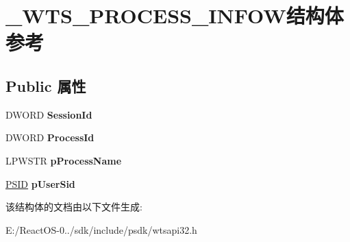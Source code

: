 \hypertarget{struct___w_t_s___p_r_o_c_e_s_s___i_n_f_o_w}{}\section{\+\_\+\+W\+T\+S\+\_\+\+P\+R\+O\+C\+E\+S\+S\+\_\+\+I\+N\+F\+O\+W结构体 参考}
\label{struct___w_t_s___p_r_o_c_e_s_s___i_n_f_o_w}
\subsection*{Public 属性}
\begin{DoxyCompactItemize}
\item 
\mbox{\label{struct___w_t_s___p_r_o_c_e_s_s___i_n_f_o_w_acb11e052069b87e968c0eb3c566c897b}} 
D\+W\+O\+RD {\bfseries Session\+Id}
\item 
\mbox{\label{struct___w_t_s___p_r_o_c_e_s_s___i_n_f_o_w_a42538ecc338fdffdccf7951b6bd9cc75}} 
D\+W\+O\+RD {\bfseries Process\+Id}
\item 
\mbox{\label{struct___w_t_s___p_r_o_c_e_s_s___i_n_f_o_w_acc8807395a67764dd36828cce0c131a0}} 
L\+P\+W\+S\+TR {\bfseries p\+Process\+Name}
\item 
\mbox{\label{struct___w_t_s___p_r_o_c_e_s_s___i_n_f_o_w_a45e31764743e588bba704a8c1ccab24f}} 
\hyperlink{struct___s_i_d}{P\+S\+ID} {\bfseries p\+User\+Sid}
\end{DoxyCompactItemize}


该结构体的文档由以下文件生成\+:\begin{DoxyCompactItemize}
\item 
E\+:/\+React\+O\+S-\/0../sdk/include/psdk/wtsapi32.\+h\end{DoxyCompactItemize}
